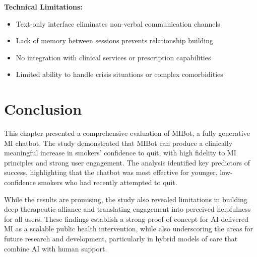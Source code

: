 \textbf{Technical Limitations:}
\begin{itemize}
\item Text-only interface eliminates non-verbal communication channels
\item Lack of memory between sessions prevents relationship building
\item No integration with clinical services or prescription capabilities
\item Limited ability to handle crisis situations or complex comorbidities
\end{itemize}

\section{Conclusion}
\label{sec:conclusion}

This chapter presented a comprehensive evaluation of MIBot, a fully generative MI chatbot. The study demonstrated that MIBot can produce a clinically meaningful increase in smokers' confidence to quit, with high fidelity to MI principles and strong user engagement. The analysis identified key predictors of success, highlighting that the chatbot was most effective for younger, low-confidence smokers who had recently attempted to quit.

While the results are promising, the study also revealed limitations in building deep therapeutic alliance and translating engagement into perceived helpfulness for all users. These findings establish a strong proof-of-concept for AI-delivered MI as a scalable public health intervention, while also underscoring the areas for future research and development, particularly in hybrid models of care that combine AI with human support.